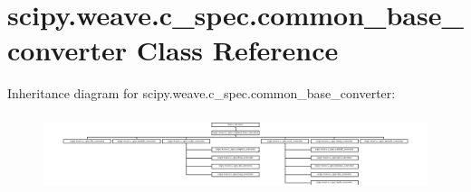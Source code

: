 \hypertarget{classscipy_1_1weave_1_1c__spec_1_1common__base__converter}{}\section{scipy.\+weave.\+c\+\_\+spec.\+common\+\_\+base\+\_\+converter Class Reference}
\label{classscipy_1_1weave_1_1c__spec_1_1common__base__converter}
Inheritance diagram for scipy.\+weave.\+c\+\_\+spec.\+common\+\_\+base\+\_\+converter\+:\begin{figure}[H]
\begin{center}
\leavevmode
\includegraphics[height=2.269504cm]{classscipy_1_1weave_1_1c__spec_1_1common__base__converter}
\end{center}
\end{figure}
